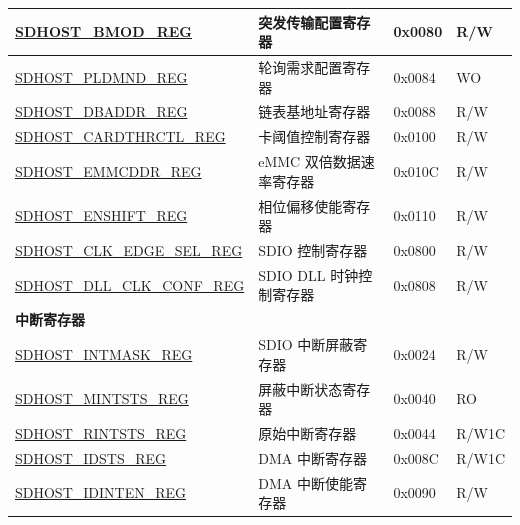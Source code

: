 \begin{longtable}{ | p{6cm} | p{7.0cm} | p{1.3cm} | p{1.2cm} | }
\hyperref[regdesc:SDHOSTBMODREG]{SDHOST\_BMOD\_REG} & 突发传输配置寄存器 & 0x0080 & R/W \\ \hline
\hyperref[regdesc:SDHOSTPLDMNDREG]{SDHOST\_PLDMND\_REG} & 轮询需求配置寄存器 & 0x0084 & WO \\ \hline
\hyperref[regdesc:SDHOSTDBADDRREG]{SDHOST\_DBADDR\_REG} & 链表基地址寄存器 & 0x0088 & R/W \\ \hline
\hyperref[regdesc:SDHOSTCARDTHRCTLREG]{SDHOST\_CARDTHRCTL\_REG} & 卡阈值控制寄存器 & 0x0100 & R/W \\ \hline
\hyperref[regdesc:SDHOSTEMMCDDRREG]{SDHOST\_EMMCDDR\_REG} & eMMC 双倍数据速率寄存器 & 0x010C & R/W \\ \hline
\hyperref[regdesc:SDHOSTENSHIFTREG]{SDHOST\_ENSHIFT\_REG} & 相位偏移使能寄存器 & 0x0110 & R/W \\ \hline
\hyperref[regdesc:SDHOSTCLKEDGESELREG]{SDHOST\_CLK\_EDGE\_SEL\_REG} & SDIO 控制寄存器 & 0x0800 & R/W \\ \hline
\hyperref[regdesc:SDHOSTDLLCLKCONFREG]{SDHOST\_DLL\_CLK\_CONF\_REG} & SDIO DLL 时钟控制寄存器 & 0x0808 & R/W \\ \hline

\multicolumn{4}{|l|}{\textbf{中断寄存器}} \\ \hline
\hyperref[regdesc:SDHOSTINTMASKREG]{SDHOST\_INTMASK\_REG} & SDIO 中断屏蔽寄存器 & 0x0024 & R/W \\ \hline
\hyperref[regdesc:SDHOSTMINTSTSREG]{SDHOST\_MINTSTS\_REG} & 屏蔽中断状态寄存器 & 0x0040 & RO \\ \hline
\hyperref[regdesc:SDHOSTRINTSTSREG]{SDHOST\_RINTSTS\_REG} & 原始中断寄存器 & 0x0044 & R/W1C \\ \hline
\hyperref[regdesc:SDHOSTIDSTSREG]{SDHOST\_IDSTS\_REG} & DMA 中断寄存器 & 0x008C & R/W1C \\ \hline
\hyperref[regdesc:SDHOSTIDINTENREG]{SDHOST\_IDINTEN\_REG} & DMA 中断使能寄存器 & 0x0090 & R/W \\ \hline


\end{longtable}
